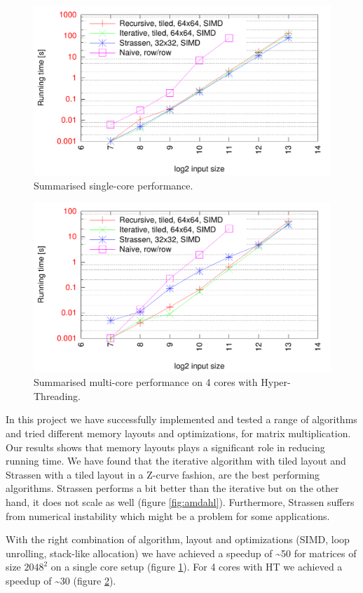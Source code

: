 \begin{figure}[h!]
  \centering
  \includegraphics[width=\textwidth]{"../project2/gnuplots/best_single"}
  \caption{Summarised single-core performance.}
  \label{fig:best_single}
\end{figure}

\begin{figure}[h!]
  \centering
  \includegraphics[width=\textwidth]{"../project2/gnuplots/best_parallel"}
  \caption{Summarised multi-core performance on 4 cores with Hyper-Threading.}
  \label{fig:best_parallel}
\end{figure}

In this project we have successfully implemented and tested a range of algorithms and tried different memory layouts and optimizations, for matrix multiplication. Our results shows that memory layouts plays a significant role in reducing running time. We have found that the iterative algorithm with tiled layout and Strassen with a tiled layout in a Z-curve fashion, are the best performing algorithms. Strassen performs a bit better than the iterative but on the other hand, it does not scale as well (figure \ref{fig:amdahl}). Furthermore, Strassen suffers from numerical instability which might be a problem for some applications.

With the right combination of algorithm, layout and optimizations (SIMD, loop unrolling, stack-like allocation) we have achieved a speedup of \textasciitilde 50 for matrices of size $2048^2$ on a single core setup (figure \ref{fig:best_single}). For 4 cores with HT we achieved a speedup of \textasciitilde 30 (figure \ref{fig:best_parallel}).